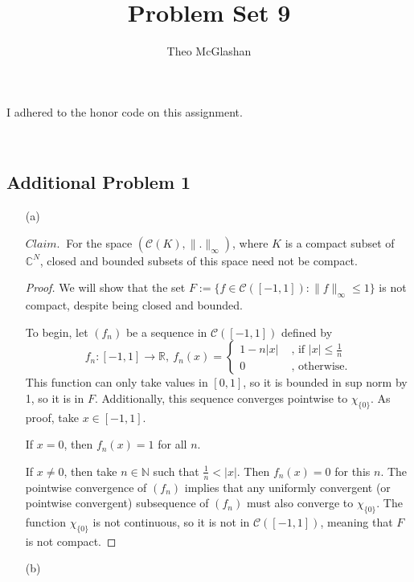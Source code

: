 \documentclass[12pt]{amsart}
\title{Problem Set 9}
\author{Theo McGlashan}
\date{}
\newcommand{\R}{\mathbb{R}}
\newcommand{\N}{\mathbb{N}}
\newcommand{\C}{\mathbb{C}}
\newcommand{\eq}[1]{\begin{equation*}#1\end{equation*}}
\newcommand{\<}{\langle}
\renewcommand{\>}{\rangle}
\renewcommand{\-}[1]{\overline{#1}}
\begin{document}
\maketitle

\begin{center}
    I adhered to the honor code on this assignment.
\end{center}

\newpage
\
\newpage

\subsection*{Additional Problem 1}

\begin{itemize}
    \item [(a)]
    
    $Claim.~$ For the space $(\mathcal{C}(K), \|.\|_\infty)$, where $K$ is a compact subset of $\C^N$, closed and bounded subsets of this space need not be compact.

\begin{proof}
    We will show that the set $F := \{f \in \mathcal{C}([-1, 1]) : \|f\|_\infty \leq 1\}$ is not compact, despite being closed and bounded.

    To begin, let $(f_n)$ be a sequence in $\mathcal{C}([-1, 1])$ defined by 
    \eq{f_n : [-1, 1] \to \R, ~ f_n(x) = \begin{cases}
        1 - n|x| &\text{ , if } |x| \leq \frac{1}{n} \\
        0 &\text{ , otherwise.}
    \end{cases}}
    This function can only take values in $[0,1]$, so it is bounded in sup norm by 1, so it is in $F$.
    Additionally, this sequence converges pointwise to $\chi_{\{0\}}$. As proof, take $x \in [-1, 1]$. 
    
    If $x = 0$, then $f_n(x) = 1$ for all $n$. 
    
    If $x \neq 0$, then take $n \in \N$ such that $\frac{1}{n} < |x|$. Then $f_n(x) = 0$ for this $n$. \newline
    The pointwise convergence of $(f_n)$ implies that any uniformly convergent (or pointwise convergent) subsequence of $(f_n)$ must also converge to $\chi_{\{0\}}$. The function $\chi_{\{0\}}$ is not continuous, so it is not in $\mathcal{C}([-1, 1])$, meaning that $F$ is not compact.
\end{proof}

    \item [(b)]
    

\end{itemize}
\end{document}
